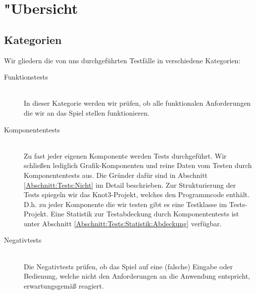 %



\section{{"U}bersicht}
\label{Abschnitt:Tests:Uebersicht}



\subsection{Kategorien}
\label{Abschnitt:Tests:Uebersicht:Kategorien}

Wir gliedern die von uns durchgeführten Testfälle in verschiedene Kategorien:\\


\begin{description} %


	\item[Funktionstests] \hfill
	\\
	
	In dieser Kategorie werden wir prüfen, ob alle funktionalen Anforderungen die wir an das Spiel stellen funktionieren.
	  
	
	\item[Komponententests] \hfill
	\\
	
	Zu fast jeder eigenen Komponente werden Tests durchgeführt. Wir schließen lediglich Grafik-Komponenten und reine Daten vom Testen durch Komponententests aus. Die Gründer dafür sind in Abschnitt \ref{Abschnitt:Tests:Nicht} im Detail beschrieben. Zur Strukturierung der Tests spiegeln wir das Knot3-Projekt, welches den Programmcode enthält. D.h. zu jeder Komponente die wir testen gibt es eine Testklasse im Tests-Projekt. Eine Statistik zur Testabdeckung durch Komponententests ist unter Abschnitt \ref{Abschnitt:Tests:Statistik:Abdeckung} verfügbar.\\


	\item[Negativtests] \hfill
	\\
	
	Die Negativtests prüfen, ob das Spiel auf eine (falsche) Eingabe oder Bedienung, welche nicht den Anforderungen an die Anwendung entspricht, erwartungsgemäß reagiert.
	

\end{description}

